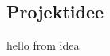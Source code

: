 \documentclass[.../Dokumentation.tex]{subfiles}
\begin{document}
    \subsection{Projektidee}\label{sec-intr-idea}
    hello from idea
\end{document}
